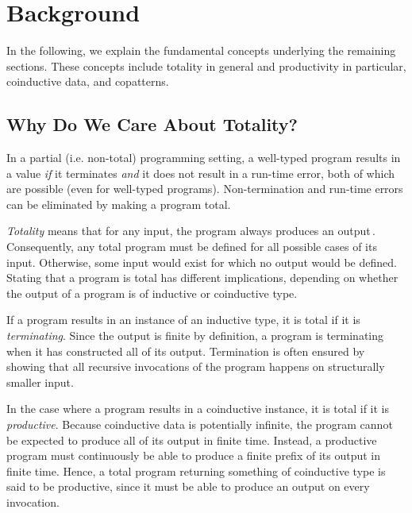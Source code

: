 \section{Background}
\label{sec:background}

In the following, we explain the fundamental concepts underlying the remaining sections. These concepts include totality in general and productivity in particular, coinductive data, and copatterns.

\subsection{Why Do We Care About Totality?}
In a partial (i.e. non-total) programming setting, a well-typed program results in a value \emph{if} it terminates \emph{and} it does not result in a run-time error, both of which are possible (even for well-typed programs). Non-termination and run-time errors can be eliminated by making a program total.

\emph{Totality} means that for any input, the program always produces an output\,\citep{Turner04totalfunctional}. Consequently, any total program must be defined for all possible cases of its input. Otherwise, some input would exist for which no output would be defined. Stating that a program is total has different implications, depending on whether the output of a program is of inductive or coinductive type.

If a program results in an instance of an inductive type, it is total if it is \emph{terminating}. Since the output is finite by definition, a program is terminating when it has constructed all of its output. Termination is often ensured by showing that all recursive invocations of the program happens on structurally smaller input.

In the case where a program results in a coinductive instance, it is total if it is \emph{productive}. Because coinductive data is potentially infinite, the program cannot be expected to produce all of its output in finite time. Instead, a productive program must continuously be able to produce a finite prefix of its output in finite time. Hence, a total program returning something of coinductive type is said to be productive, since it must be able to produce an output on every invocation.


